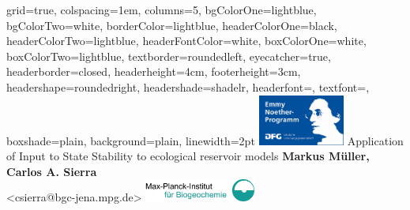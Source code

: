 \documentclass[portrait,final,a0paper,fontscale=0.345]{baposterSAB2018}
\begin{document}



\newcommand{\numberofcolumns}{5}
\begin{poster}%
  {
  grid=true,
  colspacing=1em,
  columns=\numberofcolumns, 
  bgColorOne=lightblue,
  bgColorTwo=white,
  borderColor=lightblue,
  headerColorOne=black,
  headerColorTwo=lightblue,
  headerFontColor=white,
  boxColorOne=white,
  boxColorTwo=lightblue,
  textborder=roundedleft,
  eyecatcher=true,
  headerborder=closed,
  headerheight=4cm,
  footerheight=3cm,
  headershape=roundedright,
  headershade=shadelr,
  headerfont=\Large, %
  textfont={\setlength{\parindent}{1.5em}},
  boxshade=plain,
  background=plain,
  linewidth=2pt
  }
  {\includegraphics[height=4.5em]{images/logos/EmmyNoether}
  } 
  {Application of Input to State Stability to ecological reservoir models}
  {
 {\bf  Markus M\"uller, Carlos A. Sierra}   \\
  {\small  <csierra@bgc-jena.mpg.de> } %
  }
  {%
   \includegraphics[height=2em]{BGClogo}
  }
  {
}
\end{poster}
\end{document}
